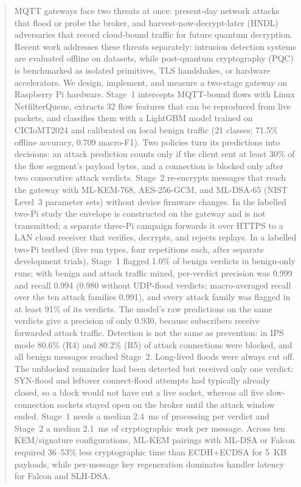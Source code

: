 \documentclass[journal]{IEEEtran}
\begin{document}
\begin{abstract}
MQTT gateways face two threats at once: present-day network attacks that flood or probe the broker, and harvest-now-decrypt-later (HNDL) adversaries that record cloud-bound traffic for future quantum decryption. Recent work addresses these threats separately: intrusion detection systems are evaluated offline on datasets, while post-quantum cryptography (PQC) is benchmarked as isolated primitives, TLS handshakes, or hardware accelerators. We design, implement, and measure a two-stage gateway on Raspberry Pi hardware. Stage~1 intercepts MQTT-bound flows with Linux NetfilterQueue, extracts 32 flow features that can be reproduced from live packets, and classifies them with a LightGBM model trained on CICIoMT2024 and calibrated on local benign traffic (21 classes; 71.5\% offline accuracy, 0.709 macro-F1). Two policies turn its predictions into decisions: an attack prediction counts only if the client sent at least 30\% of the flow segment's payload bytes, and a connection is blocked only after two consecutive attack verdicts. Stage~2 re-encrypts messages that reach the gateway with ML-KEM-768, AES-256-GCM, and ML-DSA-65 (NIST Level~3 parameter sets) without device firmware changes. In the labelled two-Pi study the envelope is constructed on the gateway and is not transmitted; a separate three-Pi campaign forwards it over HTTPS to a LAN cloud receiver that verifies, decrypts, and rejects replays. In a labelled two-Pi testbed (five run types, four repetitions each, after separate development trials), Stage~1 flagged 1.0\% of benign verdicts in benign-only runs; with benign and attack traffic mixed, per-verdict precision was 0.999 and recall 0.994 (0.980 without UDP-flood verdicts; macro-averaged recall over the ten attack families 0.991), and every attack family was flagged in at least 91\% of its verdicts. The model's raw predictions on the same verdicts give a precision of only 0.930, because subscribers receive forwarded attack traffic. Detection is not the same as prevention: in IPS mode 80.6\% (R4) and 80.2\% (R5) of attack connections were blocked, and all benign messages reached Stage~2. Long-lived floods were always cut off. The unblocked remainder had been detected but received only one verdict: SYN-flood and leftover connect-flood attempts had typically already closed, so a block would not have cut a live socket, whereas all five slow-connection sockets stayed open on the broker until the attack window ended. Stage~1 needs a median 2.4~ms of processing per verdict and Stage~2 a median 2.1~ms of cryptographic work per message. Across ten KEM/signature configurations, ML-KEM pairings with ML-DSA or Falcon required 36--53\% less cryptographic time than ECDH+ECDSA for 5~KB payloads, while per-message key regeneration dominates handler latency for Falcon and SLH-DSA.
\end{abstract}
\end{document}
